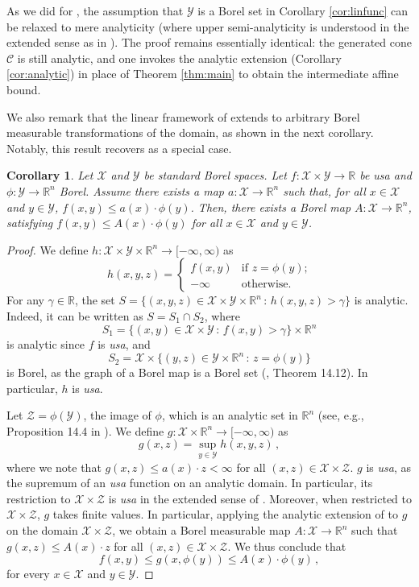 \documentclass[10pt, a4paper]{article}
\newcommand{\R}{\mathbb R}
\newcommand{\usa}{\emph{usa}\xspace}
\newcommand{\X}{\mathcal X}
\newcommand{\Y}{\mathcal Y}
\newtheorem{corollary}{Corollary}
\begin{document}
As we did for , the assumption that $\Y$ is a Borel set in Corollary \ref{cor:linfunc} can be relaxed to mere analyticity (where upper semi-analyticity is understood in the extended sense as in ). The proof remains essentially identical: the generated cone $\mathcal{C}$ is still analytic, and one  invokes the analytic extension (Corollary \ref{cor:analytic}) in place of Theorem \ref{thm:main} to obtain the intermediate affine bound.

We also remark that the linear framework of    extends to arbitrary Borel measurable transformations of the domain, as shown in the next corollary. Notably, this result recovers  as a special case.
\begin{corollary}\label{cor:feature}
    Let $\X$ and $\Y$ be standard Borel spaces. Let $f:\X\times\Y\to\R$ be \usa and $\phi:\Y\to\R^n$  Borel. Assume there exists a map $a:\X\to\R^n$ such that, for all $x\in\X$ and $y\in\Y$, $f(x,y)\le a(x)\cdot \phi(y)$. Then, there exists a Borel  map $A:\X\to\mathbb R^n$, satisfying $f(x,y)\leq A(x)\cdot \phi(y)$ for all $x\in\X$ and $y\in\Y$.
\end{corollary}
\begin{proof}
     We define $h:\X\times\Y\times\R^n\to[-\infty,\infty)$ as
    $$h(x,y,z) = \begin{cases}f(x,y)&\text{if $z=\phi(y)$;}\\-\infty&\text{otherwise.}\end{cases}$$
    For any $\gamma\in\R$, the set $S = \{(x,y,z) \in \X\times\Y\times\R^n\,:\,h(x,y,z)>\gamma\}$ is analytic. Indeed, it can be written as $S = S_1\cap S_2$, where
    $$S_1 = \{(x,y)\in \X\times\Y\,:\,f(x,y)>\gamma\}\times\R^n$$ is analytic since $f$ is \usa, and 
    $$S_2 = \X\times \{(y,z)\in\Y\times\R^n\,:\,z=\phi(y)\}$$ is Borel, as the graph of a Borel map is a Borel set (\cite{kechris1995classical}, Theorem 14.12). In particular, $h$ is \usa. 
    
    Let $\mathcal Z=\phi(\Y)$, the image of $\phi$, which is an analytic set in $\R^n$ (see, e.g., Proposition 14.4 in \cite{kechris1995classical}). We define $g:\X\times\R^n\to[-\infty, \infty)$ as 
    $$g(x,z) = \sup_{y\in\Y}h(x,y,z)\,,$$
    where we note that $g(x,z)\leq a(x)\cdot z<\infty$ for all $(x,z)\in\X\times\mathcal Z$. $g$ is \usa, as the supremum of an \usa function on an analytic domain. In particular, its restriction to $\X\times\mathcal Z$ is \usa in the extended sense of . Moreover, when restricted to $\X\times\mathcal Z$, $g$ takes finite values. In particular, applying the analytic extension of  to $g$ on the domain $\X\times\mathcal Z$, we obtain a Borel measurable map $A:\X\to\R^n$ such that $g(x,z) \le A(x)\cdot z$ for all $(x,z) \in \X\times\mathcal Z$. We thus conclude that $$f(x,y)\leq g(x,\phi(y))\leq A(x)\cdot\phi(y)\,,$$ for every $x\in\X$ and $y\in\Y$. 
    \end{proof}
\end{document}
